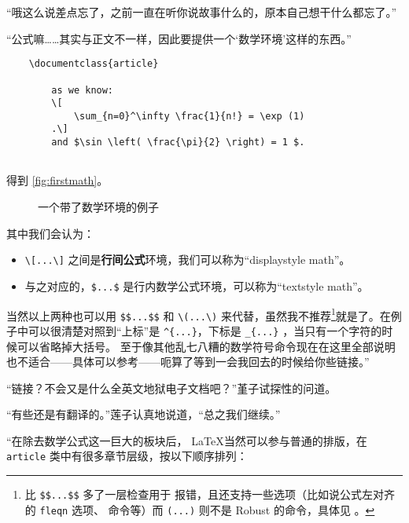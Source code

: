 “哦这么说差点忘了，之前一直在听你说故事什么的，原本自己想干什么都忘了。”

“公式嘛……其实与正文不一样，因此要提供一个‘数学环境’这样的东西。”

\begin{lstlisting}
    \documentclass{article}
    
        as we know:
        \[
            \sum_{n=0}^\infty \frac{1}{n!} = \exp (1)
        .\]
        and $\sin \left( \frac{\pi}{2} \right) = 1 $.
    
\end{lstlisting}

得到 \autoref{fig:firstmath}。

\begin{figure}[th]
    \centering
    \caption{一个带了数学环境的例子}
    \label{fig:firstmath}
\end{figure}

其中我们会认为：
\begin{itemize}
    \item \verb"\[...\]" 之间是\textbf{行间公式}环境，我们可以称为``displaystyle math''。
    \item 与之对应的，\verb"$...$" 是行内数学公式环境，可以称为``textstyle math''。
\end{itemize}

当然以上两种也可以用 \verb"$$...$$" 和 \verb"\(...\)" 来代替，虽然我不推荐\footnote{\texttt{\cs[...\cs]} 比 \texttt{\$\$...\$\$} 多了一层检查用于  报错，且还支持一些选项（比如说公式左对齐的 \texttt{fleqn} 选项、  命令等）而 \texttt{\CS(...\CS)} 则不是 Robust 的命令，具体见 \textcite[The \LaTeXe{} Sources]{braams2003latex2varepsilon} 。}就是了。在例子中可以很清楚对照到“上标”是 \verb"^{...}"，下标是 \verb"_{...}" ，当只有一个字符的时候可以省略掉大括号。 至于像其他乱七八糟的数学符号命令现在在这里全部说明也不适合——具体可以参考——呃算了等到一会我回去的时候给你些链接。”

“链接？不会又是什么全英文地狱电子文档吧？”堇子试探性的问道。

“有些还是有翻译的。”莲子认真地说道，“总之我们继续。”

“在除去数学公式这一巨大的板块后， \LaTeX 当然可以参与普通的排版，在 \verb"article" 类中有很多章节层级，按以下顺序排列：

